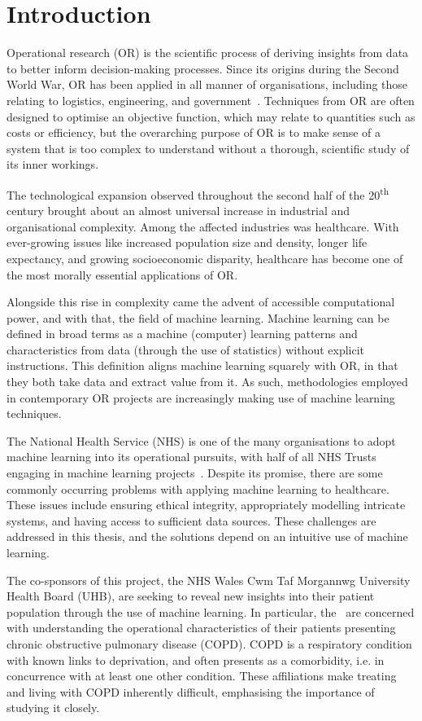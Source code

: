 \chapter{Introduction}
\label{chp:intro}

Operational research (OR) is the scientific process of deriving insights from
data to better inform decision-making processes. Since its origins during the
Second World War, OR has been applied in all manner of organisations, including
those relating to logistics, engineering, and government~\cite{Hillier2005}.
Techniques from OR are often designed to optimise an objective function, which
may relate to quantities such as costs or efficiency, but the overarching
purpose of OR is to make sense of a system that is too complex to understand
without a thorough, scientific study of its inner workings.

The technological expansion observed throughout the second half of the
20\textsuperscript{th} century brought about an almost universal increase in
industrial and organisational complexity. Among the affected industries was
healthcare. With ever-growing issues like increased population size and density,
longer life expectancy, and growing socioeconomic disparity, healthcare has
become one of the most morally essential applications of OR.

Alongside this rise in complexity came the advent of accessible computational
power, and with that, the field of machine learning. Machine learning can be
defined in broad terms as a machine (computer) learning patterns and
characteristics from data (through the use of statistics) without explicit
instructions. This definition aligns machine learning squarely with OR, in that
they both take data and extract value from it. As such, methodologies employed
in contemporary OR projects are increasingly making use of machine learning
techniques.

The National Health Service (NHS) is one of the many organisations to adopt
machine learning into its operational pursuits, with half of all NHS Trusts
engaging in machine learning projects~\cite{Hughes2019}. Despite its promise,
there are some commonly occurring problems with applying machine learning to
healthcare. These issues include ensuring ethical integrity, appropriately
modelling intricate systems, and having access to sufficient data sources. These
challenges are addressed in this thesis, and the solutions depend on an
intuitive use of machine learning.

The co-sponsors of this project, the NHS Wales Cwm Taf Morgannwg University
Health Board (UHB), are seeking to reveal new insights into their patient
population through the use of machine learning. In particular, the \ctmuhb\ are
concerned with understanding the operational characteristics of their patients
presenting chronic obstructive pulmonary disease (COPD). COPD is a respiratory
condition with known links to deprivation, and often presents as a comorbidity,
i.e. in concurrence with at least one other condition. These affiliations make
treating and living with COPD inherently difficult, emphasising the importance
of studying it closely.

